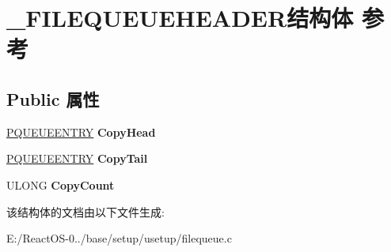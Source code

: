 \hypertarget{struct___f_i_l_e_q_u_e_u_e_h_e_a_d_e_r}{}\section{\+\_\+\+F\+I\+L\+E\+Q\+U\+E\+U\+E\+H\+E\+A\+D\+E\+R结构体 参考}
\label{struct___f_i_l_e_q_u_e_u_e_h_e_a_d_e_r}
\subsection*{Public 属性}
\begin{DoxyCompactItemize}
\item 
\mbox{\label{struct___f_i_l_e_q_u_e_u_e_h_e_a_d_e_r_a14cd0a75564a530e230200efc37141b6}} 
\hyperlink{struct___q_u_e_u_e_e_n_t_r_y}{P\+Q\+U\+E\+U\+E\+E\+N\+T\+RY} {\bfseries Copy\+Head}
\item 
\mbox{\label{struct___f_i_l_e_q_u_e_u_e_h_e_a_d_e_r_a444f161d370ce4086c3516ea5f2bb14b}} 
\hyperlink{struct___q_u_e_u_e_e_n_t_r_y}{P\+Q\+U\+E\+U\+E\+E\+N\+T\+RY} {\bfseries Copy\+Tail}
\item 
\mbox{\label{struct___f_i_l_e_q_u_e_u_e_h_e_a_d_e_r_ac28de58791fc9f29ec8d4fc4a5b64171}} 
U\+L\+O\+NG {\bfseries Copy\+Count}
\end{DoxyCompactItemize}


该结构体的文档由以下文件生成\+:\begin{DoxyCompactItemize}
\item 
E\+:/\+React\+O\+S-\/0../base/setup/usetup/filequeue.\+c\end{DoxyCompactItemize}
